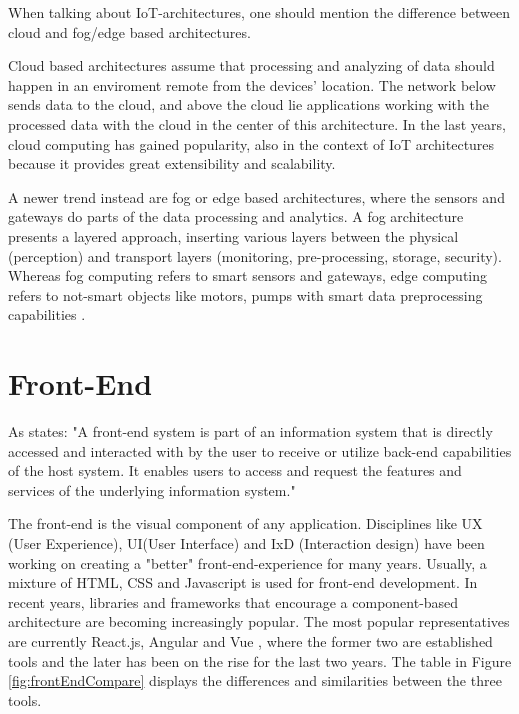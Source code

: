 When talking about IoT-architectures, one should mention the difference between cloud and fog/edge based architectures. 

Cloud based architectures assume that processing and analyzing of data should happen in an enviroment remote from the devices' location.
The network below sends data to the cloud, and above the cloud lie applications working with the processed data with the cloud in the center of this architecture.
In the last years, cloud computing has gained popularity, also in the context of IoT architectures \parencite{CloudComputing} because it provides great extensibility and scalability.

A newer trend instead are fog or edge based architectures, where the sensors and gateways do parts of the data processing and analytics.
A fog architecture \parencite{FogComputing1, FogComp} presents a layered approach, inserting various layers between the physical (perception) and transport layers 
(monitoring, pre-processing, storage, security). 
Whereas fog computing refers to smart sensors and gateways, edge computing refers to not-smart objects like motors, pumps with 
smart data preprocessing capabilities \parencite{edgeFog}.


\section{Front-End}
As \parencite{frontendDef} states:
"A front-end system is part of an information system that is directly accessed and interacted with by the user to receive or 
utilize back-end capabilities of the host system. 
It enables users to access and request the features and services of the underlying information system."  

The front-end is the visual component of any application. 
Disciplines like UX (User Experience), UI(User Interface) and  IxD (Interaction design) have been working on creating 
a "better" front-end-experience for many years. 
Usually, a mixture of HTML, CSS and Javascript is used for front-end development. 
In recent years, libraries and frameworks that encourage a component-based architecture are becoming increasingly popular.
The most popular representatives are currently React.js, Angular and Vue \parencite{reactjsAngularVue} 
, where the former two are established tools and the later has been on the rise for the last two years.
The table in Figure \ref{fig:frontEndCompare} displays the differences and similarities between the three tools.


